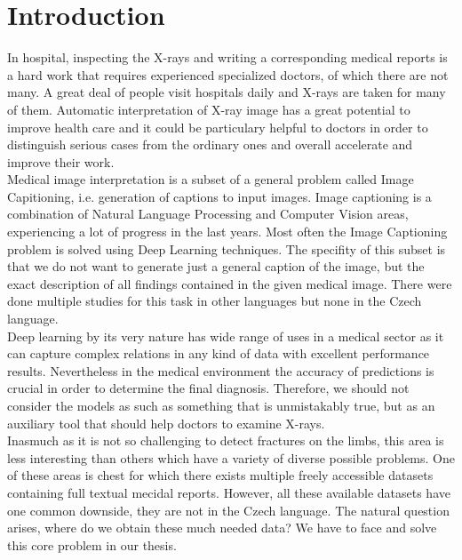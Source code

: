 \chapter*{Introduction}

In hospital, inspecting the X-rays and writing a corresponding medical reports is a hard work that requires experienced specialized doctors, of which there are not many. A great deal of people visit hospitals daily and X-rays are taken for many of them. Automatic interpretation of X-ray image has a great potential to improve health care and it could be particulary helpful to doctors in order to distinguish serious cases from the ordinary ones and overall accelerate and improve their work.\\

Medical image interpretation is a subset of a general problem called Image Capitioning, i.e. generation of captions to input images. Image captioning is a combination of Natural Language Processing and Computer Vision areas, experiencing a lot of progress in the last years. Most often the Image Captioning problem is solved using Deep Learning techniques. The specifity of this subset is that we do not want to generate just a general caption of the image, but the exact description of all findings contained in the given medical image. There were done multiple studies for this task in other languages but none in the Czech language.\\

Deep learning by its very nature has wide range of uses in a medical sector as it can capture complex relations in any kind of data with excellent performance results. Nevertheless in the medical environment the accuracy of predictions is crucial in order to determine the final diagnosis. Therefore, we should not consider the models as such as something that is unmistakably true, but as an auxiliary tool that should help doctors to examine X-rays.\\

Inasmuch as it is not so challenging to detect fractures on the limbs, this area is less interesting than others which have a variety of diverse possible problems. One of these areas is chest for which there exists multiple freely accessible datasets containing full textual mecidal reports. However, all these available datasets have one common downside, they are not in the Czech language. The natural question arises, where do we obtain these much needed data? We have to face and solve this core problem in our thesis.\\

